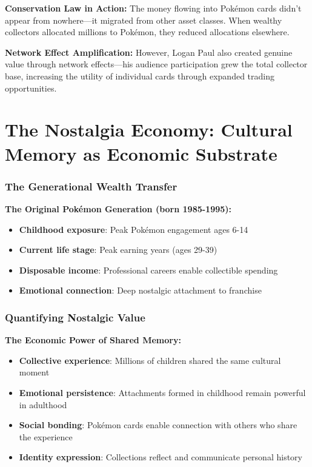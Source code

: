 \documentclass[11pt,oneside]{book}
\begin{document}
\textbf{Conservation Law in Action:}
The money flowing into Pokémon cards didn't appear from nowhere—it migrated from other asset classes. When wealthy collectors allocated millions to Pokémon, they reduced allocations elsewhere.

\textbf{Network Effect Amplification:}
However, Logan Paul also created genuine value through network effects—his audience participation grew the total collector base, increasing the utility of individual cards through expanded trading opportunities.

\section{The Nostalgia Economy: Cultural Memory as Economic Substrate}

\subsubsection{The Generational Wealth Transfer}

\textbf{The Original Pokémon Generation (born 1985-1995):}
\begin{itemize}
\item \textbf{Childhood exposure}: Peak Pokémon engagement ages 6-14
\item \textbf{Current life stage}: Peak earning years (ages 29-39)
\item \textbf{Disposable income}: Professional careers enable collectible spending
\item \textbf{Emotional connection}: Deep nostalgic attachment to franchise
\end{itemize}

\subsubsection{Quantifying Nostalgic Value}

\textbf{The Economic Power of Shared Memory:}
\begin{itemize}
\item \textbf{Collective experience}: Millions of children shared the same cultural moment
\item \textbf{Emotional persistence}: Attachments formed in childhood remain powerful in adulthood
\item \textbf{Social bonding}: Pokémon cards enable connection with others who share the experience
\item \textbf{Identity expression}: Collections reflect and communicate personal history
\end{itemize}
\end{document}
